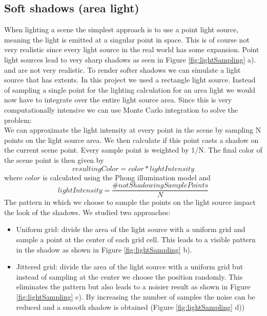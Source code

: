 \documentclass[sigconf, nonacm]{acmart}
\begin{document}
\subsection{Soft shadows (area light)}
When lighting a scene the simplest approach is to use a point light source, meaning the light is emitted at a singular point in space. This is
of course not very realistic since every light source in the real world has some expansion. Point light sources lead to very sharp shadows as seen in 
Figure \ref{fig:lightSampling} a).
and are not very realistic. To render softer shadows we can simulate a light source that has extents. In this project we used a rectangle light source.
Instead of sampling a single point for the lighting calculation for an area light we would now have to integrate over the entire light source area.
Since this is very computationally intensive we can use Monte Carlo integration to solve the problem:\\
We can approximate the light intensity at every point in the scene by sampling N points on the light source area. We then calculate if this 
point casts a shadow on the current scene point. Every sample point is weighted by 1/N. The final color of the scene point is then given by
\[ resultingColor = color * lightIntensity \] 
where \(color\) is calculated using the Phong illumination model and 
\[lightIntensity = \frac{\#notShadowingSamplePoints}{N}\]
The pattern in which we choose to sample the points on the light source impact the look of the shadows. We studied two approaches:
\begin{itemize}
  \item Uniform grid: divide the area of the light source with a uniform grid and sample a point at the center of each grid cell. 
  This leads to a visible pattern in the shadow as shown in Figure \ref{fig:lightSampling} b).
  \item Jittered grid: divide the area of the light source with a uniform grid but instead of sampling at the center we choose the position randomly.
  This eliminates the pattern but also leads to a noisier result as shown in Figure \ref{fig:lightSampling} c). By increasing the number of samples
  the noise can be reduced and a smooth shadow is obtained (Figure \ref{fig:lightSampling} d))

\end{itemize}
\end{document}
